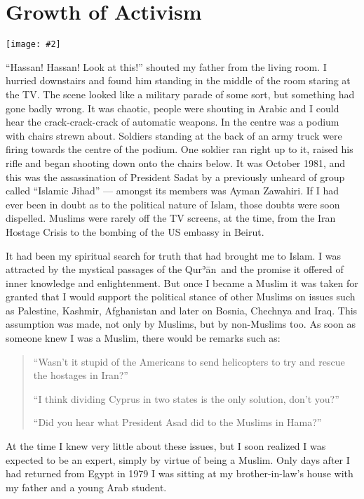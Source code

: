 \documentclass[12pt]{memoir}
\def\´{ʾ} %
\def \Quran{Qur\-\´ān} %
\def\–{-\hskip0pt}
\newcommand{\img}[3]{\begin{center}%
\texttt{[image: \#2]}\\{\small\em#3}%
\end{center}}
\begin{document}
\chapter{Growth of Activism}

\img{scale=0.7}{Assassination_of_Sadat.jpg}{}

“Hassan! Hassan! Look at this!”
shouted my father from the living room.
I hurried downstairs and found him standing
in the middle of the room staring at the TV.
The scene looked like a military parade of some sort,
but something had gone badly wrong.
It was chaotic, people were shouting in Arabic
and I could hear the crack\–crack\–crack of automatic weapons.
In the centre was a podium with chairs strewn about.
Soldiers standing at the back of an army truck
were firing towards the centre of the podium.
One soldier ran right up to it,
raised his rifle and began shooting down onto the chairs below.
It was October 1981, and this was the assassination of President Sadat
by a previously unheard of group called “Islamic Jihad” —
amongst its members was Ayman Zawahiri.
If I had ever been in doubt as to the political nature of Islam,
those doubts were soon dispelled.
Muslims were rarely off the TV screens, at the time,
from the Iran Hostage Crisis to the bombing of the US embassy in Beirut.

It had been my spiritual search for truth that had brought me to Islam.
I was attracted by the mystical passages of the \Quran\
and the promise it offered of inner knowledge and enlightenment.
But once I became a Muslim it was taken for granted that I would support
the political stance of other Muslims on issues such as Palestine,
Kashmir, Afghanistan and later on Bosnia, Chechnya and Iraq.
This assumption was made, not only by Muslims, but by non-Muslims too.
As soon as someone knew I was a Muslim, there would be remarks such as:

\begin{quote}
“Wasn’t it stupid of the Americans to send helicopters
to try and rescue the hostages in Iran?”

“I think dividing Cyprus in two states is the only solution, don’t you?”

“Did you hear what President Asad did to the Muslims in Hama?”
\end{quote}

At the time I knew very little about these issues,
but I soon realized I was expected to be an expert,
simply by virtue of being a Muslim.
Only days after I had returned from Egypt in 1979
I was sitting at my brother-in-law’s house
with my father and a young Arab student.
\end{document}
